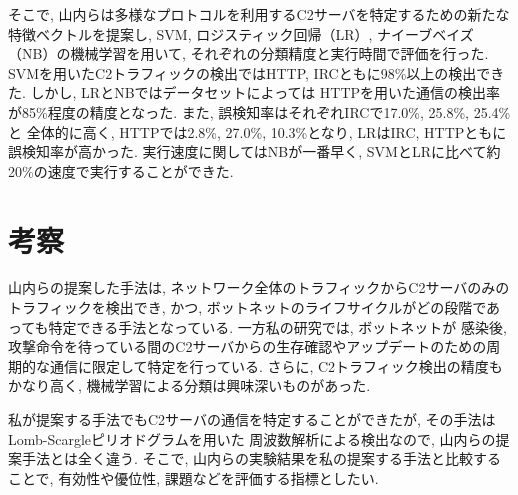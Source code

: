 \documentclass[twocolumn,9]{ltjsarticle}
\begin{document}
そこで, 山内らは多様なプロトコルを利用するC2サーバを特定するための新たな特徴ベクトルを提案し, SVM, 
ロジスティック回帰（LR）, ナイーブベイズ（NB）の機械学習を用いて, それぞれの分類精度と実行時間で評価を行った. 
SVMを用いたC2トラフィックの検出ではHTTP, IRCともに98\%以上の検出できた. しかし, LRとNBではデータセットによっては
HTTPを用いた通信の検出率が85\%程度の精度となった. また, 誤検知率はそれぞれIRCで17.0\%, 25.8\%, 25.4\%と
全体的に高く, HTTPでは2.8\%, 27.0\%, 10.3\%となり, LRはIRC, HTTPともに誤検知率が高かった. 
実行速度に関してはNBが一番早く, SVMとLRに比べて約20\%の速度で実行することができた. 

\section{考察}
山内らの提案した手法は, ネットワーク全体のトラフィックからC2サーバのみのトラフィックを検出でき, かつ, 
ボットネットのライフサイクルがどの段階であっても特定できる手法となっている. 一方私の研究では, ボットネットが
感染後, 攻撃命令を待っている間のC2サーバからの生存確認やアップデートのための周期的な通信に限定して特定を行っている. 
さらに, C2トラフィック検出の精度もかなり高く, 機械学習による分類は興味深いものがあった. 

私が提案する手法でもC2サーバの通信を特定することができたが, その手法はLomb-Scargleピリオドグラムを用いた
周波数解析による検出なので, 山内らの提案手法とは全く違う. そこで, 山内らの実験結果を私の提案する手法と比較することで, 
有効性や優位性, 課題などを評価する指標としたい. 



\end{document}
